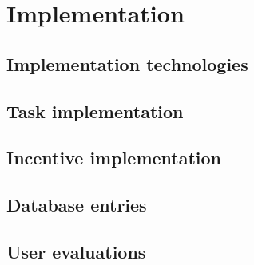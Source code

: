 \section{Implementation}


\subsection{Implementation technologies}
\subsection{Task implementation}
\subsection{Incentive implementation}
\subsection{Database entries}
\subsection{User evaluations}
